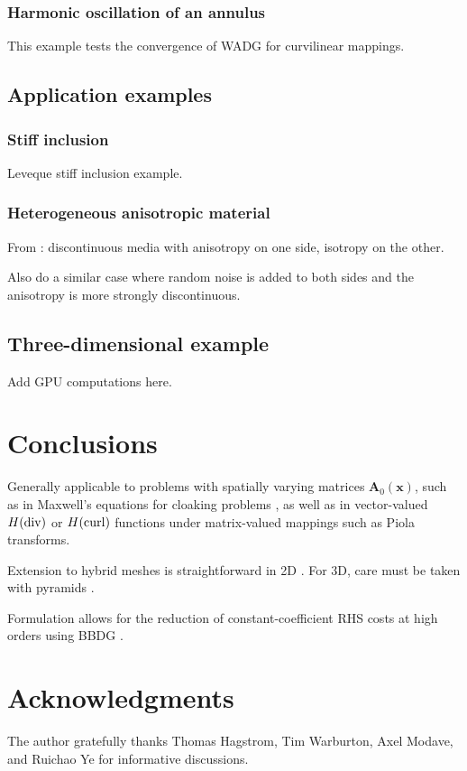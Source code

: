 \documentclass{siamart0216}
\begin{document}
\subsubsection{Harmonic oscillation of an annulus}

This example tests the convergence of WADG for curvilinear mappings.  

\subsection{Application examples}

\subsubsection{Stiff inclusion}

Leveque stiff inclusion example.  

\subsubsection{Heterogeneous anisotropic material}

From \cite{de2007arbitrary}: discontinuous media with anisotropy on one side, isotropy on the other.

Also do a similar case where random noise is added to both sides and the anisotropy is more strongly discontinuous.  

\subsection{Three-dimensional example}

Add GPU computations here.   

\section{Conclusions}

Generally applicable to problems with spatially varying matrices $\bm{A}_{0}(\bm{x})$, such as in Maxwell's equations for cloaking problems \cite{li2012time}, as well as in vector-valued $H({\rm div})$ or $H({\rm curl})$ functions under matrix-valued mappings such as Piola transforms.  

Extension to hybrid meshes is straightforward in 2D \cite{smith2010elastic}. For 3D, care must be taken with pyramids \cite{chan2015orthogonal,chan2015gpu}.

Formulation allows for the reduction of constant-coefficient RHS costs at high orders using BBDG \cite{chan2015bbdg}.  

\section{Acknowledgments}

The author gratefully thanks Thomas Hagstrom, Tim Warburton, Axel Modave, and Ruichao Ye for informative discussions.  



\end{document}
